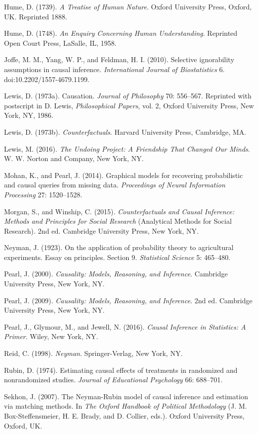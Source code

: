 \documentclass[11pt,a5paper,twoside]{book}
\begin{document}
Hume, D. (1739). \textit{A Treatise of Human Nature}. Oxford University Press, Oxford, UK. Reprinted 1888.

Hume, D. (1748). \textit{An Enquiry Concerning Human Understanding}. Reprinted Open Court Press, LaSalle, IL, 1958.

Joffe, M. M., Yang, W. P., and Feldman, H. I. (2010). Selective ignorability assumptions in causal inference. \textit{International Journal of Biostatistics} 6. doi:10.2202/1557-4679.1199.

Lewis, D. (1973a). Causation. \textit{Journal of Philosophy} 70: 556–567. Reprinted with postscript in D. Lewis, \textit{Philosophical Papers}, vol. 2, Oxford University Press, New York, NY, 1986.

Lewis, D. (1973b). \textit{Counterfactuals}. Harvard University Press, Cambridge, MA.

Lewis, M. (2016). \textit{The Undoing Project: A Friendship That Changed Our Minds}. W. W. Norton and Company, New York, NY.

Mohan, K., and Pearl, J. (2014). Graphical models for recovering probabilistic and causal queries from missing data. \textit{Proceedings of Neural Information Processing} 27: 1520–1528.

Morgan, S., and Winship, C. (2015). \textit{Counterfactuals and Causal Inference: Methods and Principles for Social Research} (Analytical Methods for Social Research). 2nd ed. Cambridge University Press, New York, NY.

Neyman, J. (1923). On the application of probability theory to agricultural experiments. Essay on principles. Section 9. \textit{Statistical Science} 5: 465–480.

Pearl, J. (2000). \textit{Causality: Models, Reasoning, and Inference}. Cambridge University Press, New York, NY.

Pearl, J. (2009). \textit{Causality: Models, Reasoning, and Inference}. 2nd ed. Cambridge University Press, New York, NY.

Pearl, J., Glymour, M., and Jewell, N. (2016). \textit{Causal Inference in Statistics: A Primer}. Wiley, New York, NY.

Reid, C. (1998). \textit{Neyman}. Springer-Verlag, New York, NY.

Rubin, D. (1974). Estimating causal effects of treatments in randomized and nonrandomized studies. \textit{Journal of Educational Psychology} 66: 688–701.

Sekhon, J. (2007). The Neyman-Rubin model of causal inference and estimation via matching methods. In \textit{The Oxford Handbook of Political Methodology} (J. M. Box-Steffensmeier, H. E. Brady, and D. Collier, eds.). Oxford University Press, Oxford, UK.
\end{document}
